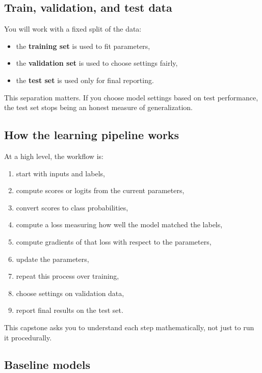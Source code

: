 \documentclass[11pt]{article}
\begin{document}
\subsection{Train, validation, and test data}

You will work with a fixed split of the data:

\begin{itemize}
    \item the \textbf{training set} is used to fit parameters,
    \item the \textbf{validation set} is used to choose settings fairly,
    \item the \textbf{test set} is used only for final reporting.
\end{itemize}

This separation matters. If you choose model settings based on test performance, the test set stops being an honest measure of generalization.

\subsection{How the learning pipeline works}

At a high level, the workflow is:

\begin{enumerate}
    \item start with inputs and labels,
    \item compute scores or logits from the current parameters,
    \item convert scores to class probabilities,
    \item compute a loss measuring how well the model matched the labels,
    \item compute gradients of that loss with respect to the parameters,
    \item update the parameters,
    \item repeat this process over training,
    \item choose settings on validation data,
    \item report final results on the test set.
\end{enumerate}

This capstone asks you to understand each step mathematically, not just to run it procedurally.

\subsection{Baseline models}
\end{document}
